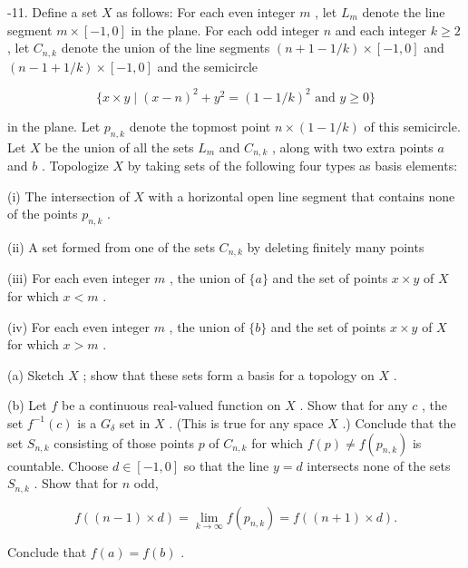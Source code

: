 -11. Define a set \(X\) as follows: For each even integer \(m\) , let \({L}_{m}\) denote the line segment \(m \times  \left\lbrack  {-1,0}\right\rbrack\) in the plane. For each odd integer \(n\) and each integer \(k \geq  2\) , let \({C}_{n,k}\) denote the union of the line segments \(\left( {n + 1 - 1/k}\right)  \times  \left\lbrack  {-1,0}\right\rbrack\) and \(\left( {n - 1 + 1/k}\right)  \times  \left\lbrack  {-1,0}\right\rbrack\) and the semicircle

\[
\{ x \times  y \mid  {\left( x - n\right) }^{2} + {y}^{2} = {\left( 1 - 1/k\right) }^{2}\text{ and }y \geq  0\}
\]

in the plane. Let \({p}_{n,k}\) denote the topmost point \(n \times  \left( {1 - 1/k}\right)\) of this semicircle. Let \(X\) be the union of all the sets \({L}_{m}\) and \({C}_{n,k}\) , along with two extra points \(a\) and \(b\) . Topologize \(X\) by taking sets of the following four types as basis elements:

(i) The intersection of \(X\) with a horizontal open line segment that contains none of the points \({p}_{n,k}\) .

(ii) A set formed from one of the sets \({C}_{n,k}\) by deleting finitely many points

(iii) For each even integer \(m\) , the union of \(\{ a\}\) and the set of points \(x \times  y\) of \(X\) for which \(x < m\) .

(iv) For each even integer \(m\) , the union of \(\{ b\}\) and the set of points \(x \times  y\) of \(X\) for which \(x > m\) .

(a) Sketch \(X\) ; show that these sets form a basis for a topology on \(X\) .

(b) Let \(f\) be a continuous real-valued function on \(X\) . Show that for any \(c\) , the set \({f}^{-1}\left( c\right)\) is a \({G}_{\delta }\) set in \(X\) . (This is true for any space \(X\) .) Conclude that the set \({S}_{n,k}\) consisting of those points \(p\) of \({C}_{n,k}\) for which \(f\left( p\right)  \neq  f\left( {p}_{n,k}\right)\) is countable. Choose \(d \in  \left\lbrack  {-1,0}\right\rbrack\) so that the line \(y = d\) intersects none of the sets \({S}_{n,k}\) . Show that for \(n\) odd,

\[
f\left( {\left( {n - 1}\right)  \times  d}\right)  = \mathop{\lim }\limits_{{k \rightarrow  \infty }}f\left( {p}_{n,k}\right)  = f\left( {\left( {n + 1}\right)  \times  d}\right) .
\]

Conclude that \(f\left( a\right)  = f\left( b\right)\) .

